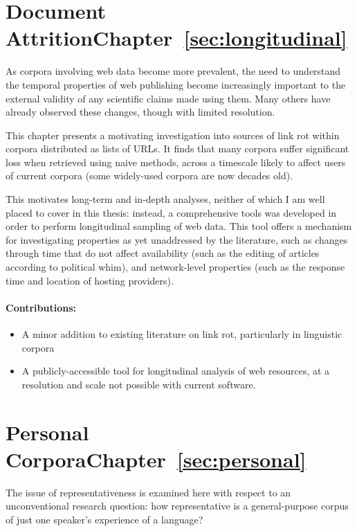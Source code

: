 \section{Document Attrition\hfill{}Chapter~\ref{sec:longitudinal}}
As corpora involving web data become more prevalent, the need to understand the temporal properties of web publishing become increasingly important to the external validity of any scientific claims made using them.  Many others have already observed these changes, though with limited resolution.

This chapter presents a motivating investigation into sources of link rot within corpora distributed as lists of URLs.  It finds that many corpora suffer significant loss when retrieved using naive methods, across a timescale likely to affect users of current corpora (some widely-used corpora are now decades old).

This motivates long-term and in-depth analyses, neither of which I am well placed to cover in this thesis: instead, a comprehensive tools was developed in order to perform longitudinal sampling of web data.  This tool offers a mechanism for investigating properties as yet unaddressed by the literature, such as changes through time that do not affect availability (such as the editing of articles according to political whim), and network-level properties (such as the response time and location of hosting providers).

\paragraph{Contributions:}
\begin{itemize}
    \item A minor addition to existing literature on link rot, particularly in linguistic corpora
    \item A publicly-accessible tool for longitudinal analysis of web resources, at a resolution and scale not possible with current software.
\end{itemize}

\section{Personal Corpora\hfill{}Chapter~\ref{sec:personal}}
The issue of representativeness is examined here with respect to an unconventional research question: how representative is a general-purpose corpus of just one speaker's experience of a language?

